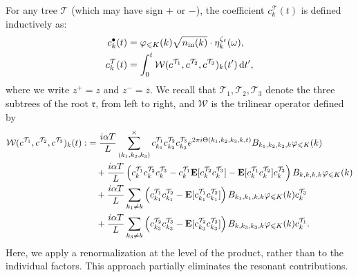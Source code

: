 \documentclass[UTF-8,reqno]{amsart}
\numberwithin{equation}{section}
\theoremstyle{definition}
\def\leq{\leqslant}
\def\leq{\leqslant}
\begin{document}
For any tree $\mathcal{T}$ (which may have sign $+$ or $-$), the coefficient $c^{\mathcal{T}}_k(t)$ is defined inductively as:
\begin{align}
    c_k^{\bullet}(t)&=\varphi_{\leq K}(k)\sqrt{n_{\mathrm{in}}(k)} \cdot\eta_{k}^{\zeta_\mathfrak{r}}(\omega),\notag\\
     c_k^{\mathcal{T}}(t)&=\int_0^t\mathcal{W}(c^{\mathcal{T}_1}, c^{\mathcal{T}_2} , c^{\mathcal{T}_3})_k(t')\,\mathrm{d}t',\label{def:ct:int}
\end{align}
where we write $z^+=z$ and $z^-=\overline{z}$. We recall that $\mathcal{T}_1,\mathcal{T}_2,\mathcal{T}_3$ denote the three subtrees of the root $\mathfrak{r}$,  from left to right, and $\mathcal{W}$ is the trilinear operator defined  by
\begin{align}
    \label{Duhamel0}
\mathcal{W}(c^{\mathcal{T}_1}, c^{\mathcal{T}_2} , c^{\mathcal{T}_3})_k(t):%
&=\frac{i\alpha T}{L}  \sum\limits_{(k_1,k_2, k_{3})}^{\times} c^{\mathcal{T}_1}_{k_1}{c^{\mathcal{T}_2}_{k_2}}  c^{\mathcal{T}_3}_{k_3} e^{2\pi i \Theta(k_1,k_2,k_3,k,t)}B_{k_1,k_2,k_3,k}\varphi_{\leq K}(k)\notag\\
&\quad+\frac{i\alpha T}{L}\left(c^{\mathcal{T}_1}_{k}{c^{\mathcal{T}_2}_{k}}c^{\mathcal{T}_3}_{k}-c^{\mathcal{T}_1}_{k}\mathbf{E}[{c^{\mathcal{T}_2}_{k}}c^{\mathcal{T}_3}_{k}]-\mathbf{E}[{c^{\mathcal{T}_1}_{k}}c^{\mathcal{T}_2}_{k}]c^{\mathcal{T}_3}_{k}\right)B_{k,k,k,k}\varphi_{\leq K}(k)\notag\\
&\quad+\frac{i\alpha T}{L}\sum_{k_1\neq k}\left(c^{\mathcal{T}_1}_{k_1}{c^{\mathcal{T}_2}_{k_1}} -\mathbf{E}[c^{\mathcal{T}_1}_{k_1}{c^{\mathcal{T}_2}_{k_1}} ] \right) B_{k_1,k_1,k,k}\varphi_{\leq K}(k)c^{\mathcal{T}_3}_{k}\notag\\
&\quad+\frac{i\alpha T}{L}\sum_{k_3\neq k}\left({c^{\mathcal{T}_2}_{k_3}}c^{\mathcal{T}_3}_{k_3} -\mathbf{E}[{c^{\mathcal{T}_2}_{k_3}}c^{\mathcal{T}_3}_{k_3} ]\right) B_{k,k_3,k_3,k}\varphi_{\leq K}(k)c^{\mathcal{T}_1}_{k}.
\end{align}
Here, we apply a renormalization at the level of the product, rather than to the individual factors. This approach partially eliminates the resonant contributions.
 
\end{document}
